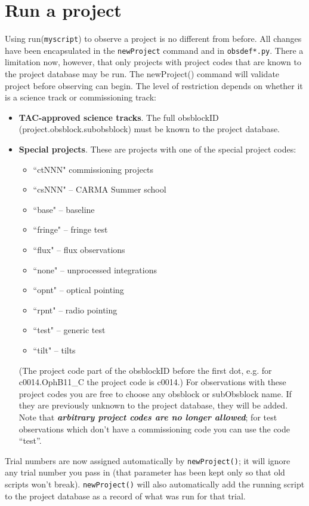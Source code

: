 \documentclass[preprint]{aastex} %
\begin{document}
\section{Run a project}

Using run({\tt myscript}) to observe a project is no different from before.
All changes have been encapsulated in the {\tt newProject} command and
in {\tt obsdef*.py}.  
There a limitation now, however, that only projects with project codes
that are known to the project database may be run. The newProject()
command will validate project before observing can begin. The level
of restriction depends on whether it is a science track or commissioning
track: 
\begin{itemize}
\item {\bf TAC-approved science tracks}.  The full obsblockID 
(project.obsblock.subobsblock) must be known to the project database.

\item {\bf Special projects}.  These are projects with one
of the special project codes:
    \begin{itemize}
    \item ``ctNNN" commissioning projects
    \item ``csNNN" -- CARMA Summer school
    \item ``base"  -- baseline
    \item ``fringe" -- fringe test
    \item ``flux"  -- flux observations
    \item ``none" --  unprocessed integrations
    \item ``opnt" --  optical pointing
    \item ``rpnt" --  radio pointing
    \item ``test" --  generic test
    \item ``tilt" --  tilts
    \end{itemize}
\noindent 
(The project code
part of the obsblockID before the first dot, e.g. for c0014.OphB11\_C
the project code is c0014.)
For observations with these project codes you are free
to choose any obsblock or subObsblock name.  If they are previously
unknown to the project database, they will be added.  Note that
{\bf \emph{arbitrary project codes are no longer allowed}}; 
for test observations 
which don't have a commissioning code you can use the code ``test''.
\end{itemize}

Trial numbers are now assigned automatically
by {\tt newProject()}; it will ignore any trial number you pass in 
(that parameter has been kept only so that old scripts won't break).
{\tt newProject()} will also automatically add the running script
to the project database as a record of what was run for that trial.
\end{document}
